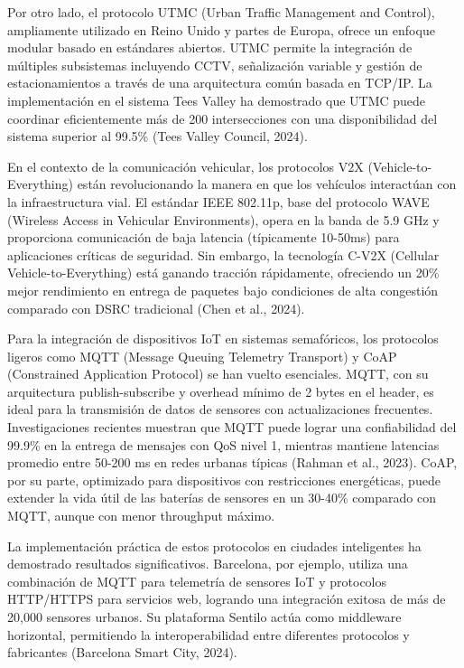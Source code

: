 \documentclass[12pt,a4paper,oneside]{report}
\begin{document}
Por otro lado, el protocolo UTMC (Urban Traffic Management and Control), ampliamente utilizado en Reino Unido y partes de Europa, ofrece un enfoque modular basado en estándares abiertos. UTMC permite la integración de múltiples subsistemas incluyendo CCTV, señalización variable y gestión de estacionamientos a través de una arquitectura común basada en TCP/IP. La implementación en el sistema Tees Valley ha demostrado que UTMC puede coordinar eficientemente más de 200 intersecciones con una disponibilidad del sistema superior al 99.5\% (Tees Valley Council, 2024).

En el contexto de la comunicación vehicular, los protocolos V2X (Vehicle-to-Everything) están revolucionando la manera en que los vehículos interactúan con la infraestructura vial. El estándar IEEE 802.11p, base del protocolo WAVE (Wireless Access in Vehicular Environments), opera en la banda de 5.9 GHz y proporciona comunicación de baja latencia (típicamente 10-50ms) para aplicaciones críticas de seguridad. Sin embargo, la tecnología C-V2X (Cellular Vehicle-to-Everything) está ganando tracción rápidamente, ofreciendo un 20\% mejor rendimiento en entrega de paquetes bajo condiciones de alta congestión comparado con DSRC tradicional (Chen et al., 2024).

Para la integración de dispositivos IoT en sistemas semafóricos, los protocolos ligeros como MQTT (Message Queuing Telemetry Transport) y CoAP (Constrained Application Protocol) se han vuelto esenciales. MQTT, con su arquitectura publish-subscribe y overhead mínimo de 2 bytes en el header, es ideal para la transmisión de datos de sensores con actualizaciones frecuentes. Investigaciones recientes muestran que MQTT puede lograr una confiabilidad del 99.9\% en la entrega de mensajes con QoS nivel 1, mientras mantiene latencias promedio entre 50-200 ms en redes urbanas típicas (Rahman et al., 2023). CoAP, por su parte, optimizado para dispositivos con restricciones energéticas, puede extender la vida útil de las baterías de sensores en un 30-40\% comparado con MQTT, aunque con menor throughput máximo.

La implementación práctica de estos protocolos en ciudades inteligentes ha demostrado resultados significativos. Barcelona, por ejemplo, utiliza una combinación de MQTT para telemetría de sensores IoT y protocolos HTTP/HTTPS para servicios web, logrando una integración exitosa de más de 20,000 sensores urbanos. Su plataforma Sentilo actúa como middleware horizontal, permitiendo la interoperabilidad entre diferentes protocolos y fabricantes (Barcelona Smart City, 2024).
\end{document}
